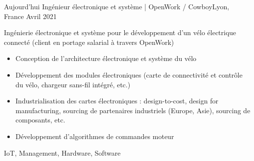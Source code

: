 %
%
%

\begin{experiences}
  \experience
    {Aujourd'hui}   {Ingénieur électronique et système | OpenWork / Cowboy}{}{Lyon, France}
    {Avril 2021} {
                      Ingénierie électronique et système pour le développement d'un vélo électrique connecté (client  en portage salarial à travers OpenWork)
                      \begin{itemize}
                        \item Conception de l'architecture électronique et système du vélo
                        \item Développement des modules électroniques (carte de connectivité et contrôle du vélo, chargeur sans-fil intégré, etc.)
                        \item Industrialisation des cartes électroniques : design-to-cost, design for manufacturing, sourcing de partenaires industriels (Europe, Asie), sourcing de composants, etc.
                        \item Développement d'algorithmes de commandes moteur
                      \end{itemize}
                    }
                    {IoT, Management, Hardware, Software}
                    
  \emptySeparator


\end{experiences}
